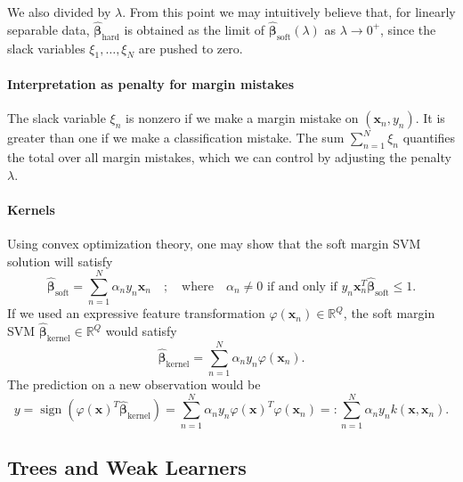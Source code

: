 We also divided by $\lambda$. From this point we may intuitively believe that, for linearly separable data, $\hat{\mathbf{\beta}}_{\text{hard}}$ is obtained as the limit of $\hat{\mathbf{\beta}}_{\text{soft}}(\lambda)$ as $\lambda \to 0^{+}$, since the slack variables $\xi_1, \ldots, \xi_N$ are pushed to zero.

\paragraph{Interpretation as penalty for margin mistakes}
The slack variable $\xi_n$ is nonzero if we make a margin mistake on $(\mathbf{x}_n, y_n)$. It is greater than one if we make a classification mistake. The sum $\sum_{n=1}^{N} \xi_n$ quantifies the total over all margin mistakes, which we can control by adjusting the penalty $\lambda$.

\paragraph{Kernels}
Using convex optimization theory, one may show that the soft margin SVM solution will satisfy
\begin{equation*}
\hat{\mathbf{\beta}}_{\text{soft}} = \sum_{n=1}^{N} \alpha_n y_n \mathbf{x}_n \quad ; \quad \text{where} \quad \alpha_n \neq 0 \text{ if and only if } y_n \mathbf{x}_n^{T} \hat{\mathbf{\beta}}_{\text{soft}} \leq 1.
\end{equation*}
If we used an expressive feature transformation $\varphi(\mathbf{x}_n) \in \mathbb{R}^{Q}$, the soft margin SVM $\hat{\mathbf{\beta}}_{\text{kernel}} \in \mathbb{R}^{Q}$ would satisfy
\begin{equation*}
\hat{\mathbf{\beta}}_{\text{kernel}} = \sum_{n=1}^{N} \alpha_n y_n \varphi(\mathbf{x}_n).
\end{equation*}
The prediction on a new observation would be
\begin{equation*}
y = \operatorname{sign}\!\left(\varphi(\mathbf{x})^{T} \hat{\mathbf{\beta}}_{\text{kernel}}\right) = \sum_{n=1}^{N} \alpha_n y_n \varphi(\mathbf{x})^{T} \varphi(\mathbf{x}_n)=: \sum_{n=1}^{N} \alpha_n y_n k(\mathbf{x},\mathbf{x}_n).
\end{equation*}

\subsection{Trees and Weak Learners}
